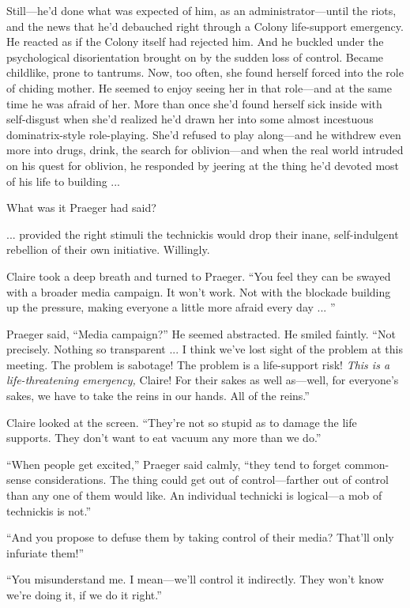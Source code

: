 Still---he'd done what was expected of him, as an administrator---until the riots, and the news that he'd debauched right through a Colony life-support emergency. He reacted as if the Colony itself had rejected him. And he buckled under the psychological disorientation brought on by the sudden loss of control. Became childlike, prone to tantrums. Now, too often, she found herself forced into the role of chiding mother. He seemed to enjoy seeing her in that role---and at the same time he was afraid of her. More than once she'd found herself sick inside with self-disgust when she'd realized he'd drawn her into some almost incestuous dominatrix-style role-playing. She'd refused to play along---and he withdrew even more into drugs, drink, the search for oblivion---and when the real world intruded on his quest for oblivion, he responded by jeering at the thing he'd devoted most of his life to building ...

What was it Praeger had said?

... provided the right stimuli the technickis would drop their inane, self-indulgent rebellion of their own initiative. Willingly.

Claire took a deep breath and turned to Praeger. ``You feel they can be swayed with a broader media campaign. It won't work. Not with the blockade building up the pressure, making everyone a little more afraid every day ... ''

Praeger said, ``Media campaign?'' He seemed abstracted. He smiled faintly. ``Not precisely. Nothing so transparent ... I think we've lost sight of the problem at this meeting. The problem is sabotage! The problem is a life-support risk! \textit{This is a life-threatening emergency,} Claire! For their sakes as well as---well, for everyone's sakes, we have to take the reins in our hands. All of the reins.''

Claire looked at the screen. ``They're not so stupid as to damage the life supports. They don't want to eat vacuum any more than we do.''

``When people get excited,'' Praeger said calmly, ``they tend to forget common-sense considerations. The thing could get out of control---farther out of control than any one of them would like. An individual technicki is logical---a mob of technickis is not.''

``And you propose to defuse them by taking control of their media? That'll only infuriate them!''

``You misunderstand me. I mean---we'll control it indirectly. They won't know we're doing it, if we do it right.''

